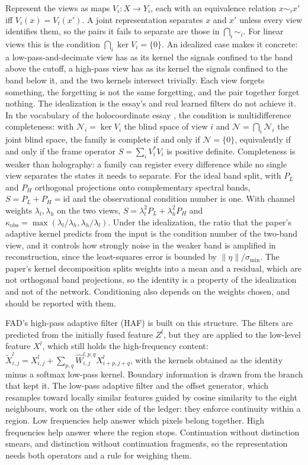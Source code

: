 \documentclass[11pt]{article}
\theoremstyle{definition}
\theoremstyle{remark}
\begin{document}
Represent the views as maps $V_i:X\to Y_i$, each with an equivalence relation $x\sim_i x'$ iff $V_i(x)=V_i(x')$. A joint representation separates $x$ and $x'$ unless every view identifies them, so the pairs it fails to separate are those in $\bigcap_i\sim_i$. For linear views this is the condition $\bigcap_i\ker V_i=\{0\}$. An idealized case makes it concrete: a low-pass-and-decimate view has as its kernel the signals confined to the band above the cutoff, a high-pass view has as its kernel the signals confined to the band below it, and the two kernels intersect trivially. Each view forgets something, the forgetting is not the same forgetting, and the pair together forget nothing. The idealization is the essay's and real learned filters do not achieve it. In the vocabulary of the holocoordinate essay \cite{holo}, the condition is multidifference completeness: with $\mathcal N_i=\ker V_i$ the blind space of view $i$ and $\mathcal N=\bigcap_i\mathcal N_i$ the joint blind space, the family is complete if and only if $\mathcal N=\{0\}$, equivalently if and only if the frame operator $S=\sum_iV_i^{*}V_i$ is positive definite. Completeness is weaker than holography: a family can register every difference while no single view separates the states it needs to separate. For the ideal band split, with $P_L$ and $P_H$ orthogonal projections onto complementary spectral bands, $S=P_L+P_H=\mathrm{id}$ and the observational condition number is one. With channel weights $\lambda_l,\lambda_h$ on the two views, $S=\lambda_l^2P_L+\lambda_h^2P_H$ and $\kappa_{\mathrm{obs}}=\max(\lambda_l/\lambda_h,\lambda_h/\lambda_l)$. Under the idealization, the ratio that the paper's adaptive kernel predicts from the input is the condition number of the two-band view, and it controls how strongly noise in the weaker band is amplified in reconstruction, since the least-squares error is bounded by $\|\eta\|/\sigma_{\min}$. The paper's kernel decomposition splits weights into a mean and a residual, which are not orthogonal band projections, so the identity is a property of the idealization and not of the network. Conditioning also depends on the weights chosen, and should be reported with them.

FAD's high-pass adaptive filter (HAF) is built on this structure. The filters are predicted from the initially fused feature $Z^l$, but they are applied to the low-level feature $X^l$, which still holds the high-frequency content: $\tilde X^l_{i,j}=X^l_{i,j}+\sum_{p,q}\hat W^{l,p,q}_{i,j}X^l_{i+p,j+q}$, with the kernels obtained as the identity minus a softmax low-pass kernel. Boundary information is drawn from the branch that kept it. The low-pass adaptive filter and the offset generator, which resamples toward locally similar features guided by cosine similarity to the eight neighbours, work on the other side of the ledger: they enforce continuity within a region. Low frequencies help answer which pixels belong together. High frequencies help answer where the region stops. Continuation without distinction smears, and distinction without continuation fragments, so the representation needs both operators and a rule for weighing them.
\end{document}
